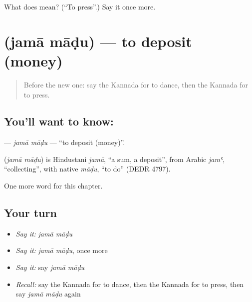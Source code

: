 \begin{tcolorbox}[breakable,colback=teal!4,colframe=teal!35!black,title={Before you move on}]
What does  mean? (\textquotedblleft{}To press\textquotedblright{}.) Say it once more.
\end{tcolorbox}
\section[\texorpdfstring{\kn{ಜಮಾ} \kn{ಮಾಡು} (jamā māḍu)}{ಜಮಾ ಮಾಡು (jamā māḍu)}]{  (jamā māḍu) — to deposit (money)}

\label{lesson:KA-C274-jama-madu}



\begin{quote}
Before the new one: say the Kannada for to dance, then the Kannada for to press.
\end{quote}

\subsection*{You'll want to know:  }
\textbf{ } — \emph{jamā māḍu} — \textquotedblleft{}to deposit (money)\textquotedblright{}.

\begin{cousinweb}
\textbf{ } (\emph{jamā māḍu}) is Hindustani \emph{jamā}, \textquotedblleft{}a sum, a deposit\textquotedblright{}, from Arabic \emph{jamʿ}, \textquotedblleft{}collecting\textquotedblright{}, with native \emph{māḍu}, \textquotedblleft{}to do\textquotedblright{} (DEDR 4797).
\end{cousinweb}

\begin{grammarlens}[title={What you've built}]
One more word for this chapter.
\end{grammarlens}

\subsection*{Your turn}
\begin{itemize}
\raggedright
  \item \emph{Say it:} \emph{jamā māḍu}
  \item \emph{Say it:} \emph{jamā māḍu}, once more
  \item \emph{Say it:} say \emph{jamā māḍu}
  \item \emph{Recall:} say the Kannada for to dance, then the Kannada for to press, then say \emph{jamā māḍu} again
\end{itemize}

